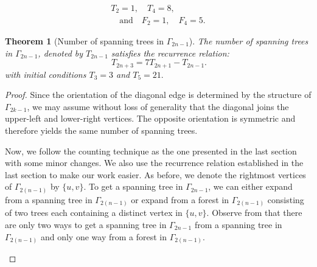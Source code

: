 \documentclass[10pt,a4paper]{amsart}
\newtheorem{theorem}{Theorem}
\begin{document}
\begin{equation}\label{eqn:initialvalues1}
    \begin{aligned}
    T_2 = 1, \quad T_4 = 8,\\
    \quad \text{and} \quad
    F_2 = 1, \quad F_4 = 5.
    \end{aligned}
\end{equation}

\begin{theorem}[Number of spanning trees in $\Gamma_{2n - 1}$]\label{thm:sthomogenousodd}
The number of spanning trees in $\Gamma_{2n - 1}$, denoted by $T_{2n - 1}$ satisfies the recurrence relation: 
\[\ T_{2n+3} = 7T_{2n+1} - T_{2n - 1}.\]
with initial conditions $T_3 = 3$ and $T_5 = 21.$
\end{theorem}

\begin{proof} 
    \par %
    Since the orientation of the diagonal edge is determined by the structure of $\Gamma_{2k-1}$, we may assume without loss of generality that the diagonal joins the upper-left and lower-right vertices. The opposite orientation is symmetric and therefore yields the same number of spanning trees.
    \par
    Now, we follow the counting technique as the one presented in the last section with some minor changes. We also use the recurrence relation established in the last section to make our work easier. As before, we denote the rightmost vertices of $\Gamma_{2(n - 1)}$ by $\{u, v\}$. To get a spanning tree in $\Gamma_{2n - 1}$, we can either expand from a spanning tree in $\Gamma_{2(n - 1)}$ or expand from a forest in $\Gamma_{2(n - 1)}$ consisting of two trees each containing a distinct vertex in $\{u, v\}$. Observe from  that there are only two ways to get a spanning tree in $\Gamma_{2n - 1}$ from a spanning tree in $\Gamma_{2(n - 1)}$ and only one way  from a forest in $\Gamma_{2(n - 1)}$.


    \begin{figure}[htbp]
        \centering
\end{figure}
\end{proof}
\end{document}
